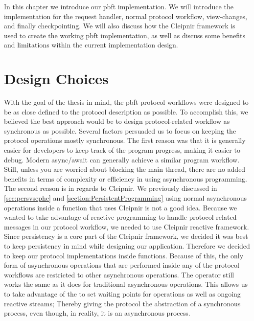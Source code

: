 \iffalse
In this chapter we introduce our \ac{pbft} implementation. We will introduce the implementation for the request handler, normal protocol workflow, view-changes, and finally checkpointing. We will also discuss how the Cleipnir framework is used to create the working \ac{pbft} implementation, as well as discuss some benefits and limitations within the current implementation design.

\section{Design Choices}
With the goal of the thesis in mind, the \ac{pbft} protocol workflows were designed to be as close defined to the protocol description as possible. To accomplish this, we believed the best approach would be to design protocol-related workflow as synchronous as possible. Several factors persuaded us to focus on keeping the protocol operations mostly synchronous. The first reason was that it is generally easier for developers to keep track of the program progress, making it easier to debug. Modern async/await can generally achieve a similar program workflow. Still, unless you are worried about blocking the main thread, there are no added benefits in terms of complexity or efficiency in using asynchronous programming. The second reason is in regards to Cleipnir. We previously discussed in \autoref{sec:persvsephe} and \autoref{section:PersistentProgramming} using normal asynchronous operations inside a function that uses Cleipnir is not a good idea. Because we wanted to take advantage of reactive programming to handle protocol-related messages in our protocol workflow, we needed to use Cleipnir reactive framework. Since persistency is a core part of the Cleipnir framework, we decided it was best to keep persistency in mind while designing our application. Therefore we decided to keep our protocol implementations inside  functions. Because of this, the only form of asynchronous operations that are performed inside any of the protocol workflows are restricted to other  asynchronous operations. The  operator still works the same as it does for traditional asynchronous operations. This allows us to take advantage of the  to set waiting points for  operations as well as ongoing reactive streams; Thereby giving the protocol the abstraction of a synchronous process, even though, in reality, it is an asynchronous process. 

